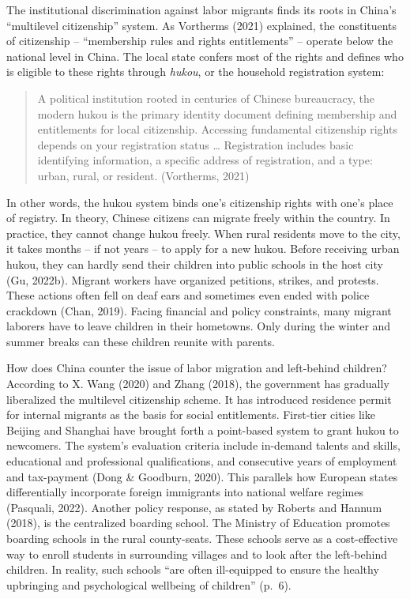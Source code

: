 \documentclass[
  man,floatsintext]{apa7}
\begin{document}
The institutional discrimination against labor migrants finds its roots in China's ``multilevel citizenship'' system. As Vortherms (2021) explained, the constituents of citizenship -- ``membership rules and rights entitlements'' -- operate below the national level in China. The local state confers most of the rights and defines who is eligible to these rights through \emph{hukou}, or the household registration system:

\begin{quote}
A political institution rooted in centuries of Chinese bureaucracy, the modern hukou is the primary identity document defining membership and entitlements for local citizenship. Accessing fundamental citizenship rights depends on your registration status \ldots{} Registration includes basic identifying information, a specific address of registration, and a type: urban, rural, or resident. (Vortherms, 2021)
\end{quote}

In other words, the hukou system binds one's citizenship rights with one's place of registry. In theory, Chinese citizens can migrate freely within the country. In practice, they cannot change hukou freely. When rural residents move to the city, it takes months -- if not years -- to apply for a new hukou. Before receiving urban hukou, they can hardly send their children into public schools in the host city (Gu, 2022b). Migrant workers have organized petitions, strikes, and protests. These actions often fell on deaf ears and sometimes even ended with police crackdown (Chan, 2019). Facing financial and policy constraints, many migrant laborers have to leave children in their hometowns. Only during the winter and summer breaks can these children reunite with parents.

How does China counter the issue of labor migration and left-behind children? According to X. Wang (2020) and Zhang (2018), the government has gradually liberalized the multilevel citizenship scheme. It has introduced residence permit for internal migrants as the basis for social entitlements. First-tier cities like Beijing and Shanghai have brought forth a point-based system to grant hukou to newcomers. The system's evaluation criteria include in-demand talents and skills, educational and professional qualifications, and consecutive years of employment and tax-payment (Dong \& Goodburn, 2020). This parallels how European states differentially incorporate foreign immigrants into national welfare regimes (Pasquali, 2022). Another policy response, as stated by Roberts and Hannum (2018), is the centralized boarding school. The Ministry of Education promotes boarding schools in the rural county-seats. These schools serve as a cost-effective way to enroll students in surrounding villages and to look after the left-behind children. In reality, such schools ``are often ill-equipped to ensure the healthy upbringing and psychological wellbeing of children'' (p.~6).
\end{document}
